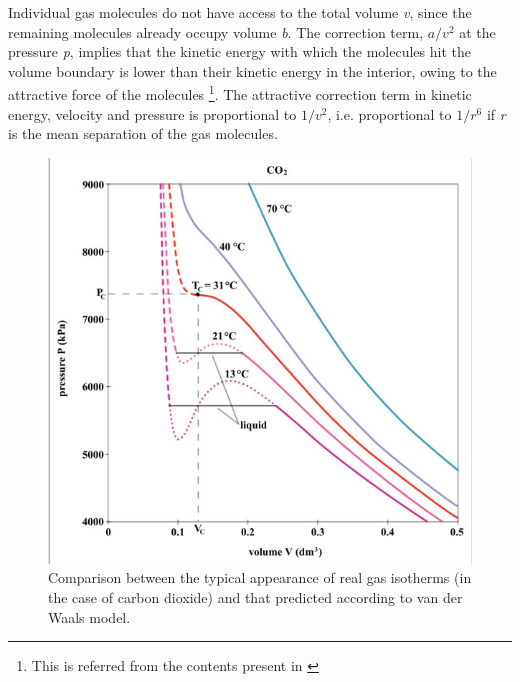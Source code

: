 \documentclass[12pt,a4paper]{article}
\begin{document}
Individual gas molecules do not have access to the total
volume \textit{v}, since the remaining molecules already occupy volume \textit{b}. The
correction term, $a/v^2$ at the pressure \textit{p}, implies that the kinetic energy with
which the molecules hit the volume boundary is lower than their kinetic
energy in the interior, owing to the attractive force of the molecules \footnote{This is referred from the contents present in \cite{langbein2006theory}}. The
attractive correction term in kinetic energy, velocity and pressure is
proportional to $1/v^2$, i.e. proportional to $1/r^6$ if \textit{r} is the mean separation
of the gas molecules.


\begin{figure}[h]
    \centering
    \includegraphics{Comparison.png}
    \caption{Comparison between the typical appearance of real gas isotherms (in the case of carbon dioxide) and that predicted according to van der Waals model.}
    \label{fig:enter-label}
\end{figure}



\end{document}
